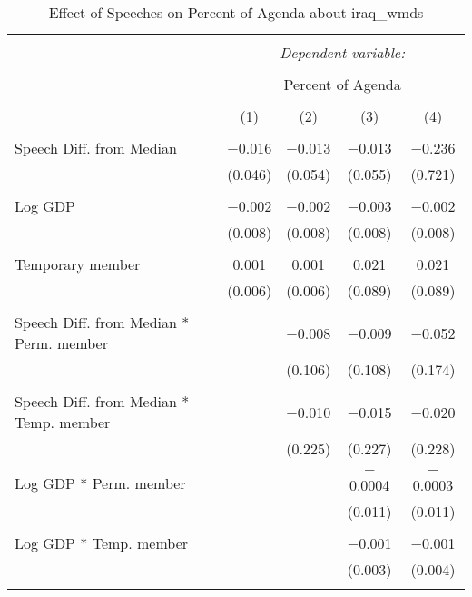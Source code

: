 
\begin{table}[!htbp] \centering 
  \caption{Effect of Speeches on Percent of Agenda about iraq_wmds} 
  \label{} 
\begin{tabular}{@{\extracolsep{5pt}}lcccc} 
\\[-1.8ex]\hline 
\hline \\[-1.8ex] 
 & \multicolumn{4}{c}{\textit{Dependent variable:}} \\ 
\cline{2-5} 
\\[-1.8ex] & \multicolumn{4}{c}{Percent of Agenda} \\ 
\\[-1.8ex] & (1) & (2) & (3) & (4)\\ 
\hline \\[-1.8ex] 
 Speech Diff. from Median & $-$0.016 & $-$0.013 & $-$0.013 & $-$0.236 \\ 
  & (0.046) & (0.054) & (0.055) & (0.721) \\ 
  & & & & \\ 
 Log GDP & $-$0.002 & $-$0.002 & $-$0.003 & $-$0.002 \\ 
  & (0.008) & (0.008) & (0.008) & (0.008) \\ 
  & & & & \\ 
 Temporary member & 0.001 & 0.001 & 0.021 & 0.021 \\ 
  & (0.006) & (0.006) & (0.089) & (0.089) \\ 
  & & & & \\ 
 Speech Diff. from Median * Perm. member &  & $-$0.008 & $-$0.009 & $-$0.052 \\ 
  &  & (0.106) & (0.108) & (0.174) \\ 
  & & & & \\ 
 Speech Diff. from Median * Temp. member &  & $-$0.010 & $-$0.015 & $-$0.020 \\ 
  &  & (0.225) & (0.227) & (0.228) \\ 
  & & & & \\ 
 Log GDP * Perm. member &  &  & $-$0.0004 & $-$0.0003 \\ 
  &  &  & (0.011) & (0.011) \\ 
  & & & & \\ 
 Log GDP * Temp. member &  &  & $-$0.001 & $-$0.001 \\ 
  &  &  & (0.003) & (0.004) \\ 
  & & & & \\ 

\end{tabular}
\end{table}
